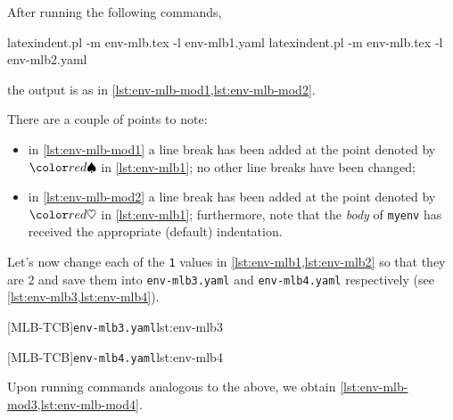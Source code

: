 After running the following commands,
\begin{commandshell}
latexindent.pl -m env-mlb.tex -l env-mlb1.yaml
latexindent.pl -m env-mlb.tex -l env-mlb2.yaml
\end{commandshell}
the output is as in \cref{lst:env-mlb-mod1,lst:env-mlb-mod2}.

\begin{sidebyside}
\begin{minipage}{.57\linewidth}
\end{minipage}
\hfill
\begin{minipage}{.42\linewidth}
\end{minipage}
\end{sidebyside}

There are a couple of points to note:
\begin{itemize}
  \item in \cref{lst:env-mlb-mod1} a line break has been added at the point denoted by $\BeginStartsOnOwnLine$ in \cref{lst:env-mlb1}; no 
    other line breaks have been changed;
  \item in \cref{lst:env-mlb-mod2} a line break has been added at the point denoted by $\BodyStartsOnOwnLine$ in \cref{lst:env-mlb1}; 
    furthermore, note that the \emph{body} of \texttt{myenv} has received the appropriate (default) indentation.
\end{itemize}

Let's now change each of the \texttt{1} values in \cref{lst:env-mlb1,lst:env-mlb2} so that they are $2$ and 
save them into \texttt{env-mlb3.yaml} and \texttt{env-mlb4.yaml} respectively (see \cref{lst:env-mlb3,lst:env-mlb4}).

\begin{minipage}{.45\textwidth}
[MLB-TCB]{\texttt{env-mlb3.yaml}}{lst:env-mlb3}
\end{minipage}
\hfill
\begin{minipage}{.45\textwidth}
[MLB-TCB]{\texttt{env-mlb4.yaml}}{lst:env-mlb4}
\end{minipage}

Upon running  commands analogous to the above, we obtain \cref{lst:env-mlb-mod3,lst:env-mlb-mod4}.

